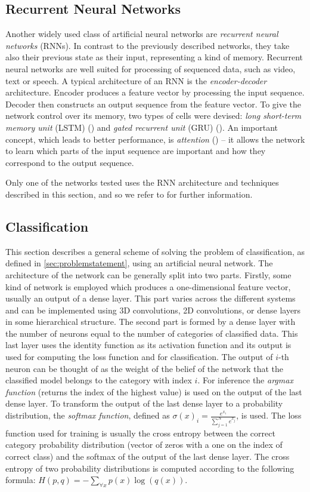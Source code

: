 \subsection{Recurrent Neural Networks}
\label{sec:rnns}
Another widely used class of artificial neural networks are \textit{recurrent neural networks} (RNNs). In contrast to the previously described networks, they take  also their previous state as their input, representing a kind of memory. Recurrent neural networks are well suited for processing of sequenced data, such as video, text or speech. A typical architecture of an RNN is the \textit{encoder-decoder} architecture. Encoder produces a feature vector by processing the input sequence. Decoder then constructs an output sequence from the feature vector. To give the network control over its memory, two types of cells were devised: \textit{long short-term memory unit} (LSTM) (\cite{hochreiter_long_1997}) and \textit{gated recurrent unit} (GRU) (\cite{cho_learning_2014}). An important concept, which leads to better performance, is \textit{attention} (\cite{bahdanau_neural_2014}) -- it allows the network to learn which parts of the input sequence are important and how they correspond to the output sequence.\par
Only one of the networks tested uses the RNN architecture and techniques described in this section, and  so we refer to \cite{goodfellow_deep_2016} for further information. 

\subsection{Classification}
This section describes a general scheme of solving the problem of classification, as defined in \autoref{sec:problemstatement}, using an artificial neural network. The architecture of the network can be generally split into two parts. Firstly, some kind of network is employed which produces a one-dimensional feature vector, usually an output of a dense layer. This part varies across the different systems and can be implemented using 3D convolutions, 2D convolutions, or dense layers in some hierarchical structure.
The second part is formed by a dense layer with the number of neurons equal to the number of categories of classified data. This last layer uses the identity function as its activation function and its output is used for computing the loss function and for classification. The output of $i$-th neuron can be thought of as the weight of the belief of the network that the classified model belongs to the category with index $i$. For inference the \textit{argmax function} (returns the index of the highest value) is used on the output of the last dense layer. To transform the output of the last dense layer to a probability distribution, the \textit{softmax function}, defined as $\sigma(x)_i = \frac{e^{x_i}}{\sum_{j=1}^{N}{e^{x_j}}} $, is used. The loss function used for training is usually the cross entropy between the correct category probability distribution (vector of zeros with a one on the index of correct class) and the softmax of the output of the last dense layer. The cross entropy of two probability distributions is computed according to the following formula: $H(p,q) = - \sum_{\forall x}{p(x)\log(q(x))}$. 

